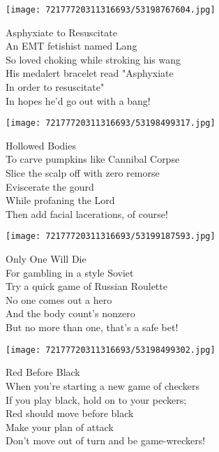 \documentclass[10pt,letterpaper]{article}
\begin{document}
\begin{center}
\texttt{[image: 72177720311316693/53198767604.jpg]}
\end{center}

\begin{center}
Asphyxiate to Resuscitate\\
\vskip 0.2in
An EMT fetishist named Lang\\
So loved choking while stroking his wang\\
His medalert bracelet read "Asphyxiate\\
In order to resuscitate"\\
In hopes he'd go out with a bang!\\
\end{center}
\pagebreak

\begin{center}\texttt{[image: 72177720311316693/53198499317.jpg]}
\end{center}
\begin{center}
Hollowed Bodies\\
\vskip 0.2in
To carve pumpkins like Cannibal Corpse\\
Slice the scalp off with zero remorse\\
Eviscerate the gourd\\
While profaning the Lord\\
Then add facial lacerations, of course!\\
\end{center}
\pagebreak

\begin{center}\texttt{[image: 72177720311316693/53199187593.jpg]}
\end{center}
\begin{center}
Only One Will Die\\
\vskip 0.2in
For gambling in a style Soviet\\
Try a quick game of Russian Roulette\\
No one comes out a hero\\
And the body count's nonzero\\
But no more than one, that's a safe bet!\\
\end{center}
\pagebreak

\begin{center}\texttt{[image: 72177720311316693/53198499302.jpg]}
\end{center}
\begin{center}
Red Before Black\\
\vskip 0.2in
When you're starting a new game of checkers\\
If you play black, hold on to your peckers;\\
Red should move before black\\
Make your plan of attack\\
Don't move out of turn and be game-wreckers!\\
\end{center}
\pagebreak
\end{document}
